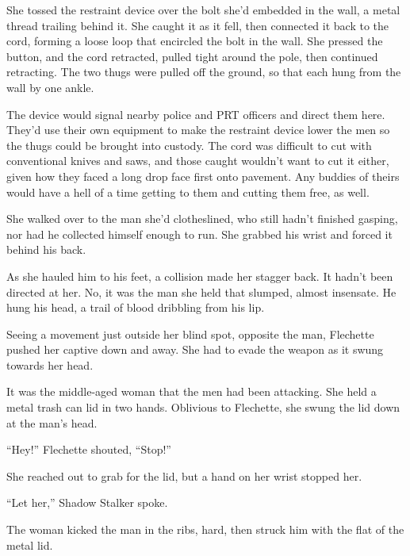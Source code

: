 She tossed the restraint device over the bolt she'd embedded in the wall, a metal thread trailing behind it.  She caught it as it fell, then connected it back to the cord, forming a loose loop that encircled the bolt in the wall.  She pressed the button, and the cord retracted, pulled tight around the pole, then continued retracting.  The two thugs were pulled off the ground, so that each hung from the wall by one ankle.



The device would signal nearby police and PRT officers and direct them here.  They'd use their own equipment to make the restraint device lower the men so the thugs could be brought into custody.  The cord was difficult to cut with conventional knives and saws, and those caught wouldn't want to cut it either, given how they faced a long drop face first onto pavement.  Any buddies of theirs would have a hell of a time getting to them and cutting them free, as well.



She walked over to the man she'd clotheslined, who still hadn't finished gasping, nor had he collected himself enough to run.  She grabbed his wrist and forced it behind his back.



As she hauled him to his feet, a collision made her stagger back.  It hadn't been directed at her.  No, it was the man she held that slumped, almost insensate.  He hung his head, a trail of blood dribbling from his lip.



Seeing a movement just outside her blind spot, opposite the man, Flechette pushed her captive down and away.  She had to evade the weapon as it swung towards her head.



It was the middle-aged woman that the men had been attacking.  She held a metal trash can lid in two hands.  Oblivious to Flechette, she swung the lid down at the man's head.



``Hey!'' Flechette shouted, ``Stop!''



She reached out to grab for the lid, but a hand on her wrist stopped her.



``Let her,'' Shadow Stalker spoke.



The woman kicked the man in the ribs, hard, then struck him with the flat of the metal lid.



